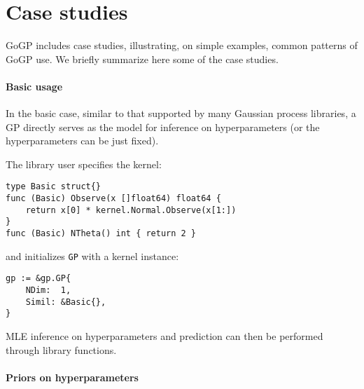 \documentclass[sigplan,review]{acmart}\settopmatter{printfolios=true,printccs=false,printacmref=false}
\begin{document}
% 

\section{Case studies}

GoGP includes case studies, illustrating, on simple examples,
common patterns of GoGP use. We briefly summarize here some
of the case studies.

\paragraph{Basic usage}

In the basic case, similar to that supported by many Gaussian
process libraries, a GP directly serves as the model for
inference on hyperparameters (or the hyperparameters can be just
fixed).

The library user specifies the kernel:
\begin{lstlisting}
type Basic struct{}
func (Basic) Observe(x []float64) float64 {
    return x[0] * kernel.Normal.Observe(x[1:])
}
func (Basic) NTheta() int { return 2 }
\end{lstlisting}
and initializes \lstinline{GP} with a kernel instance:
\begin{lstlisting}
gp := &gp.GP{
    NDim:  1,
    Simil: &Basic{},
}
\end{lstlisting}

MLE inference on hyperparameters and prediction can then be performed
through library functions.

\paragraph{Priors on hyperparameters}
\end{document}
